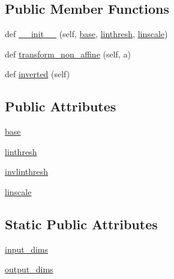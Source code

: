 \subsection*{Public Member Functions}
\begin{DoxyCompactItemize}
\item 
def \hyperlink{classmatplotlib_1_1scale_1_1InvertedSymmetricalLogTransform_a1624ac1fa840577e396cf05f66b8be50}{\+\_\+\+\_\+init\+\_\+\+\_\+} (self, \hyperlink{classmatplotlib_1_1scale_1_1InvertedSymmetricalLogTransform_a59779f3ba7cffc51f3e39bd81b1ba21b}{base}, \hyperlink{classmatplotlib_1_1scale_1_1InvertedSymmetricalLogTransform_a7a3022f95cd4a411180aa3c7fccb52db}{linthresh}, \hyperlink{classmatplotlib_1_1scale_1_1InvertedSymmetricalLogTransform_a59c1eaeccff09cab677d7a304c2957ae}{linscale})
\item 
def \hyperlink{classmatplotlib_1_1scale_1_1InvertedSymmetricalLogTransform_ad132377bb93dbe595ad81deee9efe279}{transform\+\_\+non\+\_\+affine} (self, a)
\item 
def \hyperlink{classmatplotlib_1_1scale_1_1InvertedSymmetricalLogTransform_aa93f91ff771fc63c4c9c9b9641b334d0}{inverted} (self)
\end{DoxyCompactItemize}
\subsection*{Public Attributes}
\begin{DoxyCompactItemize}
\item 
\hyperlink{classmatplotlib_1_1scale_1_1InvertedSymmetricalLogTransform_a59779f3ba7cffc51f3e39bd81b1ba21b}{base}
\item 
\hyperlink{classmatplotlib_1_1scale_1_1InvertedSymmetricalLogTransform_a7a3022f95cd4a411180aa3c7fccb52db}{linthresh}
\item 
\hyperlink{classmatplotlib_1_1scale_1_1InvertedSymmetricalLogTransform_ac33354854bac0cdb9787af275249a662}{invlinthresh}
\item 
\hyperlink{classmatplotlib_1_1scale_1_1InvertedSymmetricalLogTransform_a59c1eaeccff09cab677d7a304c2957ae}{linscale}
\end{DoxyCompactItemize}
\subsection*{Static Public Attributes}
\begin{DoxyCompactItemize}
\item 
\hyperlink{classmatplotlib_1_1scale_1_1InvertedSymmetricalLogTransform_af4d55157cd622812bb73db2162f94e34}{input\+\_\+dims}
\item 
\hyperlink{classmatplotlib_1_1scale_1_1InvertedSymmetricalLogTransform_ac87ff627c260c6e028ffb179ff7fa9b8}{output\+\_\+dims}
\end{DoxyCompactItemize}


